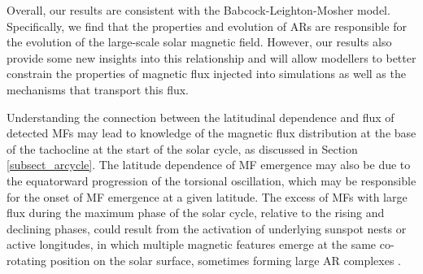 \documentclass[namedreferences]{solarphysics}
\begin{document}
\begin{article}
\begin{enumerate}





\end{enumerate}
Overall, our results are consistent with the Babcock-Leighton-Mosher model. Specifically, we find that the properties and evolution of ARs are responsible for the evolution of the large-scale solar magnetic field. However, our results also provide some new insights into this relationship and will allow modellers to better constrain the properties of magnetic flux injected into simulations as well as the mechanisms that transport this flux.

Understanding the connection between the latitudinal dependence and flux of detected MFs may lead to knowledge of the magnetic flux distribution at the base of the tachocline at the start of the solar cycle, as discussed in Section\,\ref{subsect_arcycle}. The latitude dependence of MF emergence may also be due to the equatorward progression of the torsional oscillation, which may be responsible for the onset of MF emergence at a given latitude. The excess of MFs with large flux during the maximum phase of the solar cycle, relative to the rising and declining phases, could result from the activation of underlying sunspot nests or active longitudes, in which multiple magnetic features emerge at the same co-rotating position on the solar surface, sometimes forming large AR complexes \citep{Gaizauskas:1983}.


\end{article}
\end{document}
